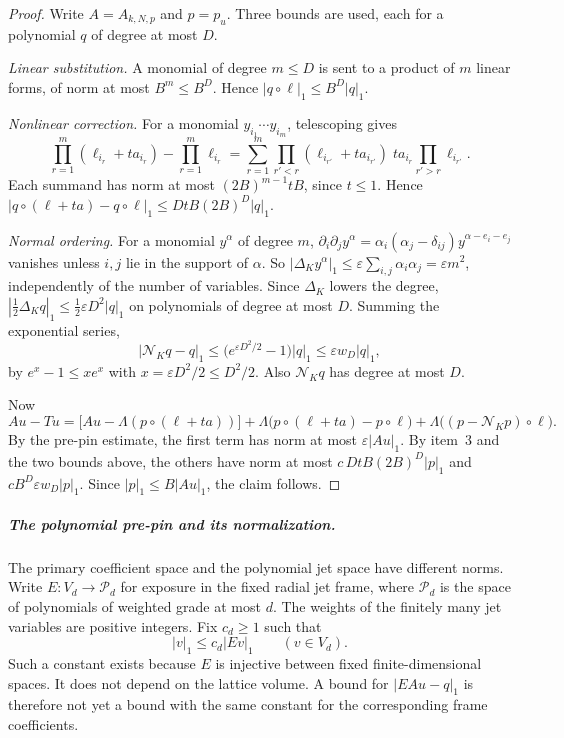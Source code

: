 \begin{proof}
Write $A=A_{k,N,p}$ and $p=p_u$. Three bounds are used, each for a
polynomial $q$ of degree at most $D$.

\emph{Linear substitution.} A monomial of degree $m\le D$ is sent to a
product of $m$ linear forms, of norm at most $B^m\le B^D$. Hence
$|q\circ\ell|_1\le B^D|q|_1$.

\emph{Nonlinear correction.} For a monomial $y_{i_1}\cdots y_{i_m}$,
telescoping gives
\[
 \prod_{r=1}^m(\ell_{i_r}+ta_{i_r})-\prod_{r=1}^m\ell_{i_r}
 =\sum_{r=1}^m\prod_{r'<r}(\ell_{i_{r'}}+ta_{i_{r'}})\;ta_{i_r}
  \prod_{r'>r}\ell_{i_{r'}} .
\]
Each summand has norm at most $(2B)^{m-1}tB$, since $t\le1$. Hence
$|q\circ(\ell+ta)-q\circ\ell|_1\le DtB(2B)^D|q|_1$.

\emph{Normal ordering.} For a monomial $y^\alpha$ of degree $m$,
$\partial_i\partial_jy^\alpha=\alpha_i(\alpha_j-\delta_{ij})y^{\alpha-e_i-e_j}$
vanishes unless $i,j$ lie in the support of $\alpha$. So
$|\Delta_Ky^\alpha|_1\le\varepsilon\sum_{i,j}\alpha_i\alpha_j=\varepsilon
m^2$, independently of the number of variables. Since $\Delta_K$ lowers the
degree, $|\frac12\Delta_Kq|_1\le\frac12\varepsilon D^2|q|_1$ on polynomials
of degree at most $D$. Summing the exponential series,
\[
 |\mathcal N_Kq-q|_1\le\bigl(e^{\varepsilon D^2/2}-1\bigr)|q|_1
 \le\varepsilon w_D|q|_1 ,
\]
by $e^x-1\le xe^x$ with $x=\varepsilon D^2/2\le D^2/2$. Also $\mathcal N_Kq$
has degree at most $D$.

Now
\[
 Au-Tu=\bigl[Au-\Lambda(p\circ(\ell+ta))\bigr]
  +\Lambda\bigl(p\circ(\ell+ta)-p\circ\ell\bigr)
  +\Lambda\bigl((p-\mathcal N_Kp)\circ\ell\bigr).
\]
By the pre-pin estimate, the first term has norm at most
$\varepsilon|Au|_1$. By item~3 and the two bounds above, the others have
norm at most $c\,DtB(2B)^D|p|_1$ and $cB^D\varepsilon w_D|p|_1$. Since
$|p|_1\le B|Au|_1$, the claim follows.
\end{proof}

\subparagraph{The polynomial pre-pin and its normalization.}
The primary coefficient space and the polynomial jet space have different
norms. Write $E:V_d\to\mathscr P_d$ for exposure in the fixed radial jet
frame, where $\mathscr P_d$ is the space of polynomials of weighted grade
at most $d$. The weights of the finitely many jet variables are positive
integers. Fix $c_d\ge1$ such that
\begin{equation}\label{eq:rank-exposure-cost}
 |v|_1\le c_d|Ev|_1\qquad(v\in V_d).
\end{equation}
Such a constant exists because $E$ is injective between fixed
finite-dimensional spaces. It does not depend on the lattice volume.
A bound for $|EAu-q|_1$ is therefore not yet a bound with the same
constant for the corresponding frame coefficients.

